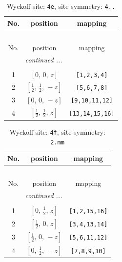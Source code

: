 \documentclass[fleqn,8pt]{jsarticle}
\begin{document}
\begin{longtable}{ccc}
\caption{Wyckoff site: {\tt 4e}, site symmetry: {\tt 4..}}
 \\
 \hline \hline
No. & position & mapping \\ \hline \endfirsthead

\multicolumn{2}{l}{\tablename\ \thetable{}} \\
 \hline \hline
No. & position & mapping \\ \hline \endhead

 \hline \hline
\multicolumn{2}{r}{\footnotesize\it continued ...} \\ \endfoot

 \hline \hline
\multicolumn{2}{r}{} \\ \endlastfoot

1 & $\left[ 0,\, 0,\, z \right]$ & {\tt [1,2,3,4]} \\ \hline
2 & $\left[ \frac{1}{2},\, \frac{1}{2},\, - z \right]$ & {\tt [5,6,7,8]} \\ \hline
3 & $\left[ 0,\, 0,\, - z \right]$ & {\tt [9,10,11,12]} \\ \hline
4 & $\left[ \frac{1}{2},\, \frac{1}{2},\, z \right]$ & {\tt [13,14,15,16]} \\
\end{longtable}
\renewcommand{\arraystretch}{1.2}
\begin{longtable}{ccc}
\caption{Wyckoff site: {\tt 4f}, site symmetry: {\tt 2.mm}}
 \\
 \hline \hline
No. & position & mapping \\ \hline \endfirsthead

\multicolumn{2}{l}{\tablename\ \thetable{}} \\
 \hline \hline
No. & position & mapping \\ \hline \endhead

 \hline \hline
\multicolumn{2}{r}{\footnotesize\it continued ...} \\ \endfoot

 \hline \hline
\multicolumn{2}{r}{} \\ \endlastfoot

1 & $\left[ 0,\, \frac{1}{2},\, z \right]$ & {\tt [1,2,15,16]} \\ \hline
2 & $\left[ \frac{1}{2},\, 0,\, z \right]$ & {\tt [3,4,13,14]} \\ \hline
3 & $\left[ \frac{1}{2},\, 0,\, - z \right]$ & {\tt [5,6,11,12]} \\ \hline
4 & $\left[ 0,\, \frac{1}{2},\, - z \right]$ & {\tt [7,8,9,10]} \\
\end{longtable}
\end{document}
